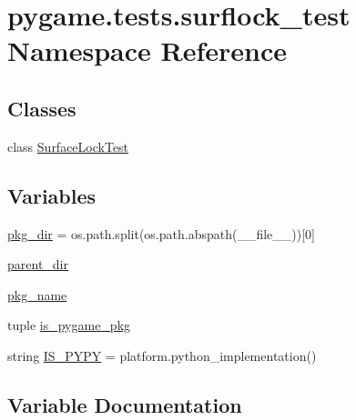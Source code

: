 \hypertarget{namespacepygame_1_1tests_1_1surflock__test}{}\section{pygame.\+tests.\+surflock\+\_\+test Namespace Reference}
\label{namespacepygame_1_1tests_1_1surflock__test}
\subsection*{Classes}
\begin{DoxyCompactItemize}
\item 
class \hyperlink{classpygame_1_1tests_1_1surflock__test_1_1_surface_lock_test}{Surface\+Lock\+Test}
\end{DoxyCompactItemize}
\subsection*{Variables}
\begin{DoxyCompactItemize}
\item 
\hyperlink{namespacepygame_1_1tests_1_1surflock__test_af630013eccba1a715755d4d9cd07a73f}{pkg\+\_\+dir} = os.\+path.\+split(os.\+path.\+abspath(\+\_\+\+\_\+file\+\_\+\+\_\+))\mbox{[}0\mbox{]}
\item 
\hyperlink{namespacepygame_1_1tests_1_1surflock__test_ac37903016a0336372b795137f061829c}{parent\+\_\+dir}
\item 
\hyperlink{namespacepygame_1_1tests_1_1surflock__test_a7d2b892c54a60aa2bd43b44f02cfbc69}{pkg\+\_\+name}
\item 
tuple \hyperlink{namespacepygame_1_1tests_1_1surflock__test_afa387a9fec689cdde57dc2f6d0988ff7}{is\+\_\+pygame\+\_\+pkg}
\item 
string \hyperlink{namespacepygame_1_1tests_1_1surflock__test_a6bbfae5da355a9d9a3b484e5ee0c0b1b}{I\+S\+\_\+\+P\+Y\+PY} = platform.\+python\+\_\+implementation()
\end{DoxyCompactItemize}


\subsection{Variable Documentation}
\mbox{\label{namespacepygame_1_1tests_1_1surflock__test_afa387a9fec689cdde57dc2f6d0988ff7}} 
